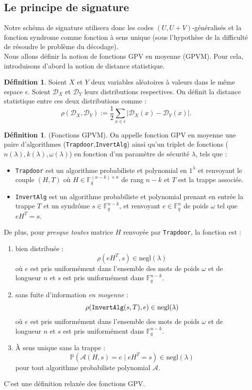 \documentclass[12pt]{article}
\theoremstyle{plain}
\theoremstyle{definition}
\newtheorem{defi}[thm]{Définition}
\newcommand{\F}{\mathbb{F}}
\begin{document}
\subsection{Le principe de signature}

Notre schéma de signature utilisera donc les codes $(U,U+V)$-généralisés et la fonction syndrome comme fonction à sens unique (sous l'hypothèse de la difficulté de résoudre le problème du décodage). \\

\noindent Nous allons définir la notion de fonctions GPV en moyenne (GPVM). Pour cela, introduisons d'abord la notion de distance statistique.

\begin{defi}
Soient $X$ et $Y$ deux variables aléatoires à valeurs dans le même espace $\epsilon$. 
Soient $\mathcal{D}_X$ et $\mathcal{D}_Y$ leurs distributions respectives. On définit la distance statistique entre ces deux distributions comme :
$$ \rho(\mathcal{D}_X,\mathcal{D}_Y) := \frac{1}{2} \sum_{x \in \epsilon} |\mathcal{D}_X(x) - \mathcal{D}_Y(x)|.$$
\end{defi}

\begin{defi} (Fonctions GPVM). On appelle fonction GPV en moyenne une paire d'algorithmes (\verb|Trapdoor|,\verb|InvertAlg|) ainsi qu'un triplet de fonctions ($n(\lambda),k(\lambda),\omega(\lambda)$) en fonction d'un paramètre de sécurité $\lambda$, tels que :
\begin{itemize}
\item \verb|Trapdoor| est un algorithme probabiliste et polynomial en $1^\lambda$ et renvoyant le couple $(H,T)$ où $H \in \F_q^{(n-k) \times n}$ de rang $n-k$ et $T$ est la trappe associée.
\item \verb|InvertAlg| est un algorithme probabiliste et polynomial prenant en entrée la trappe $T$ et un syndrôme $s \in \F_q^{n-k}$, et renvoyant $e \in \F_q^{n}$ de poids $\omega$ tel que $eH^T = s$.
\end{itemize}
De plus, pour \textit{presque toutes} matrice $H$ renvoyée par \verb|Trapdoor|, la fonction est :
\begin{enumerate}
\item bien distribuée : 
$$\rho(eH^T,s) \in \text{negl}(\lambda)$$ où $e$ est pris uniformément dans l'ensemble des mots de poids $\omega$ et de longueur $n$ et $s$ est pris uniformément dans $\F_q^{n-k}$. 
\item sans fuite d'information \textit{en moyenne} : 
$$ \rho(\verb|InvertAlg|(s,T),e) \in \text{negl}(\lambda)$$ où $e$ est pris uniformément dans l'ensemble des mots de poids $\omega$ et de longueur $n$ et $s$ est pris uniformément dans $\F_q^{n-k}$. 
\item \`A sens unique sans la trappe : 
$$\mathbb{P}(\mathcal{A}(H,s) = e \;| \;eH^T = s) \in \text{negl}(\lambda)$$
pour tout algorithme probabiliste polynomial $\mathcal{A}$.
\end{enumerate}
C'est une définition relaxée des fonctions GPV.
\end{defi}
\end{document}
